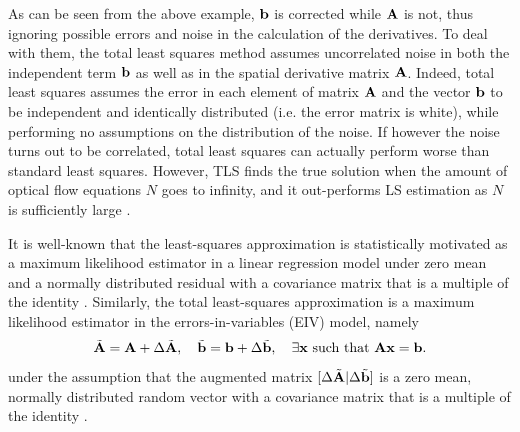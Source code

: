 As can be seen from the above example, $\mathbf{b}$ is corrected while $\mathbf{A}$ is not, thus ignoring possible errors and noise in the calculation of the derivatives. To deal with them, the total least squares method assumes uncorrelated noise in both the independent term $\mathbf{b}$ as well as in the spatial derivative matrix $\mathbf{A}$. Indeed, total least squares assumes the error in each element of matrix $\mathbf{A}$ and the vector $\mathbf{b}$ to be independent and identically distributed (i.e. the error matrix is white), while performing no assumptions on the distribution of the noise. If however the noise turns out to be correlated, total least squares can actually perform worse than standard least squares. However, TLS finds the true solution when the amount of optical flow equations $N$ goes to infinity, and it out-performs LS estimation as $N$ is sufficiently large \cite{vhva:91}. 

It is well-known that the least-squares approximation is statistically motivated as a maximum likelihood estimator in a linear regression model under zero mean and a normally distributed residual with a covariance matrix that is a multiple of the identity \cite{hayashi2000econometrics}. Similarly, the total least-squares approximation is a maximum likelihood estimator in the errors-in-variables (EIV) model, namely 
\begin{equation}
\tilde{\mathbf{A}} = \mathbf{A} + \Delta \tilde{\mathbf{A}}, \quad \tilde{\mathbf{b}} = \mathbf{b} + \Delta \tilde{\mathbf{b}}, \quad \exists \mathbf{x} \text{ such that }\mathbf{A} \mathbf{x} = \mathbf{b}.
\end{equation}
under the assumption that the augmented matrix $[\Delta \tilde{\mathbf{A}} | \Delta \tilde{\mathbf{b}}]$ is a zero mean, normally distributed random vector with a covariance matrix that is a multiple of the identity \cite{markovsky2007overview}.

